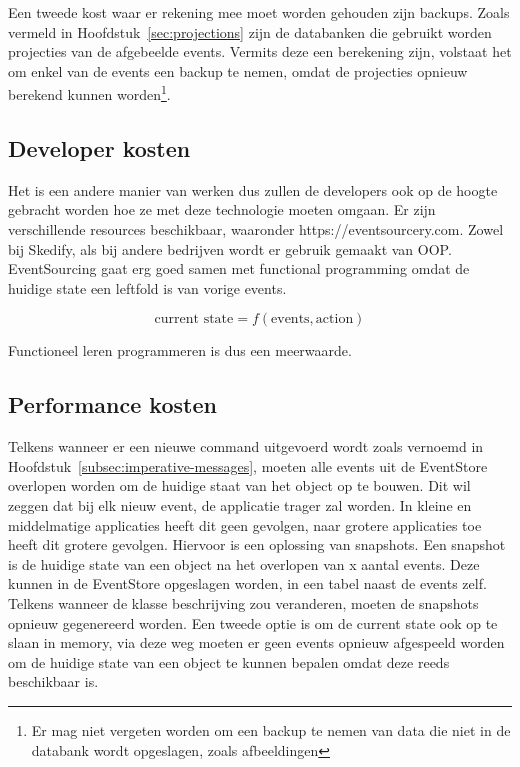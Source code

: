 Een tweede kost waar er rekening mee moet worden gehouden zijn backups. Zoals vermeld in Hoofdstuk~\ref{sec:projections} zijn de databanken die gebruikt worden projecties van de afgebeelde events. Vermits deze een berekening zijn, volstaat het om enkel van de events een backup te nemen, omdat de projecties opnieuw berekend kunnen worden\footnote{Er mag niet vergeten worden om een backup te nemen van data die niet in de databank wordt opgeslagen, zoals afbeeldingen}.

\subsection{Developer kosten}
\label{subsec:developer-kosten}

Het is een andere manier van werken dus zullen de developers ook op de hoogte gebracht worden hoe ze met deze technologie moeten omgaan. Er zijn verschillende resources beschikbaar, waaronder https://eventsourcery.com. Zowel bij Skedify, als bij andere bedrijven wordt er gebruik gemaakt van \gls{OOP}. EventSourcing gaat erg goed samen met functional programming omdat de huidige state een \gls{leftfold} is van vorige events.

\begin{equation}
\text{current state} = f(\text{events}, \text{action})
\end{equation}

Functioneel leren programmeren is dus een meerwaarde.

\subsection{Performance kosten}
\label{subsec:performance-kosten}

Telkens wanneer er een nieuwe command uitgevoerd wordt zoals vernoemd in Hoofdstuk~\ref{subsec:imperative-messages}, moeten alle events uit de EventStore overlopen worden om de huidige staat van het object op te bouwen. Dit wil zeggen dat bij elk nieuw event, de applicatie trager zal worden. In kleine en middelmatige applicaties heeft dit geen gevolgen, naar grotere applicaties toe heeft dit grotere gevolgen. Hiervoor is een oplossing van snapshots. Een snapshot is de huidige state van een object na het overlopen van x aantal events. Deze kunnen in de EventStore opgeslagen worden, in een tabel naast de events zelf. Telkens wanneer de klasse beschrijving zou veranderen, moeten de snapshots opnieuw gegenereerd worden. Een tweede optie is om de current state ook op te slaan in memory, via deze weg moeten er geen events opnieuw afgespeeld worden om de huidige state van een object te kunnen bepalen omdat deze reeds beschikbaar is.
